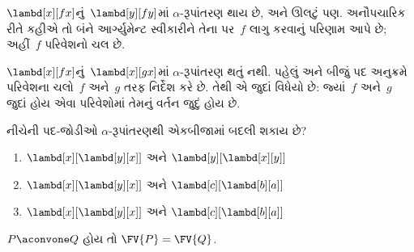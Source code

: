 \begin{ex}
  $\lambd[x][f x]$નું~$\lambd[y][f
  y]$માં $\alpha$-રૂપાંતરણ થાય છે, અને ઊલટું પણ.
  અનૌપચારિક રીતે કહીએ તો બંને આર્ગ્યુમેન્ટ સ્વીકારીને તેના
  પર~$f$ લાગુ કરવાનું પરિણામ આપે છે; અહીં~$f$ પરિવેશનો
  ચલ છે.

  $\lambd[x][f x]$નું~$\lambd[x][g
    x]$માં $\alpha$-રૂપાંતરણ થતું નથી. પહેલું અને બીજું પદ
  અનુક્રમે પરિવેશના ચલો~$f$ અને~$g$ તરફ નિર્દેશ કરે છે.
  તેથી એ જુદાં વિધેયો છે: જ્યાં~$f$ અને~$g$ જુદાં હોય એવા
  પરિવેશોમાં તેમનું વર્તન જુદું હોય છે.
\end{ex}

\begin{prob}
  નીચેની પદ-જોડીઓ $\alpha$-રૂપાંતરણથી એકબીજામાં બદલી શકાય છે?
  \begin{enumerate}
  \item $\lambd[x][\lambd[y][x]]$ અને $\lambd[y][\lambd[x][y]]$
  \item $\lambd[x][\lambd[y][x]]$ અને $\lambd[c][\lambd[b][a]]$
  \item $\lambd[x][\lambd[y][x]]$ અને $\lambd[c][\lambd[b][a]]$
  \end{enumerate}
\end{prob}

\begin{lem}
  $P \aconvone Q$ હોય તો $\FV{P} = \FV{Q}$.
\end{lem}

